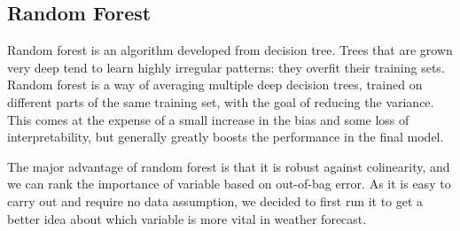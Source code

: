 \subsection{Random Forest}

Random forest is an algorithm developed from decision tree. Trees that are grown very deep tend to learn highly irregular patterns: they overfit their training sets. Random forest is a way of averaging multiple deep decision trees, trained on different parts of the same training set, with the goal of reducing the variance. This comes at the expense of a small increase in the bias and some loss of interpretability, but generally greatly boosts the performance in the final model.

The major advantage of random forest is that it is robust against colinearity, and we can rank the importance of variable based on out-of-bag error\cite{breiman2001random}. As it is easy to carry out and require no data assumption, we decided to first run it to get a better idea about which variable is more vital in weather forecast. 

